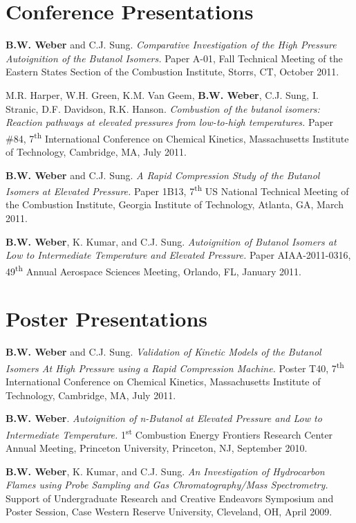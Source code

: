 \documentclass[margin,line]{res}
\newenvironment{list3}{
  \begin{list}{\ding{113}}{%
      \setlength{\itemsep}{0.1in}
      \setlength{\parsep}{0in} \setlength{\parskip}{0in}
      \setlength{\topsep}{0in} \setlength{\partopsep}{0in} 
      \setlength{\leftmargin}{0in}}}{\end{list}}
\begin{document}
\begin{resume}
\section{\sc Conference Presentations}
\begin{list3}
\item[] {\bf B.W. Weber} and C.J. Sung. {\em Comparative Investigation of the High Pressure Autoignition of the Butanol Isomers.} Paper A-01, Fall Technical Meeting of the Eastern States Section of the Combustion Institute, Storrs, CT, October 2011.
\item[] M.R. Harper, W.H. Green, K.M. Van Geem, {\bf B.W. Weber}, C.J. Sung, I. Stranic, D.F. Davidson,  R.K. Hanson. {\em Combustion of the butanol isomers: Reaction pathways at elevated pressures from low-to-high temperatures.} Paper \#84, 7\textsuperscript{th} International Conference on Chemical Kinetics, Massachusetts Institute of Technology, Cambridge, MA, July 2011.
\item[] {\bf B.W. Weber} and C.J. Sung. {\em A Rapid Compression Study of the Butanol Isomers at Elevated Pressure.} Paper 1B13, 7\textsuperscript{th} US National Technical Meeting of the Combustion Institute, Georgia Institute of Technology, Atlanta, GA, March 2011.
\item[] {\bf B.W. Weber}, K. Kumar, and C.J. Sung. {\em Autoignition of Butanol Isomers at Low to Intermediate Temperature and Elevated Pressure.} Paper AIAA-2011-0316, 49\textsuperscript{th} Annual Aerospace Sciences Meeting, Orlando, FL, January 2011.
\end{list3}

\section{\sc Poster Presentations}
\begin{list3}
\item[] {\bf B.W. Weber} and C.J. Sung. {\em Validation of Kinetic Models of the Butanol Isomers At High Pressure using a Rapid Compression Machine.} Poster T40, 7\textsuperscript{th} International Conference on Chemical Kinetics, Massachusetts Institute of Technology, Cambridge, MA, July 2011.
\item[] {\bf B.W. Weber}. {\em Autoignition of n-Butanol at Elevated Pressure and Low to Intermediate Temperature.} 1\textsuperscript{st} Combustion Energy Frontiers Research Center Annual Meeting, Princeton University, Princeton, NJ, September 2010.
\item[] {\bf B.W. Weber}, K. Kumar, and C.J. Sung. {\em An Investigation of Hydrocarbon Flames using Probe Sampling and Gas Chromatography/Mass Spectrometry.} Support of Undergraduate Research and Creative Endeavors Symposium and Poster Session, Case Western Reserve University, Cleveland, OH, April 2009.
\end{list3}


\end{resume}
\end{document}
